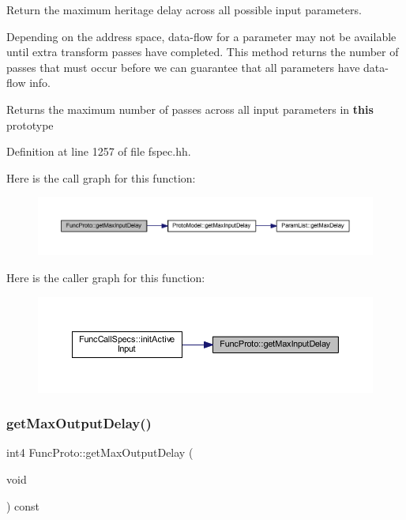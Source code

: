 Return the maximum heritage delay across all possible input parameters. 

Depending on the address space, data-\/flow for a parameter may not be available until extra transform passes have completed. This method returns the number of passes that must occur before we can guarantee that all parameters have data-\/flow info. \begin{DoxyReturn}{Returns}
the maximum number of passes across all input parameters in {\bfseries{this}} prototype 
\end{DoxyReturn}


Definition at line 1257 of file fspec.\+hh.

Here is the call graph for this function\+:
\nopagebreak
\begin{figure}[H]
\begin{center}
\leavevmode
\includegraphics[width=350pt]{class_func_proto_a07b4705cc5b9695e8c96e1e9294f0cfb_cgraph}
\end{center}
\end{figure}
Here is the caller graph for this function\+:
\nopagebreak
\begin{figure}[H]
\begin{center}
\leavevmode
\includegraphics[width=350pt]{class_func_proto_a07b4705cc5b9695e8c96e1e9294f0cfb_icgraph}
\end{center}
\end{figure}
\mbox{\label{class_func_proto_a79cb1fac9b0d2d2c55d3ff4fa7db5c27}} 
\subsubsection{\texorpdfstring{getMaxOutputDelay()}{getMaxOutputDelay()}}
{\footnotesize\ttfamily int4 Func\+Proto\+::get\+Max\+Output\+Delay (\begin{DoxyParamCaption}\item[{void}]{ }\end{DoxyParamCaption}) const\hspace{0.3cm}{\ttfamily [inline]}}



